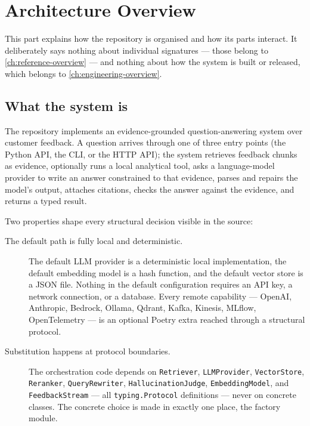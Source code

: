 
\chapter{Architecture Overview}
\label{ch:architecture-overview}

This part explains how the repository is organised and how its parts interact.
It deliberately says nothing about individual signatures --- those belong to
\cref{ch:reference-overview} --- and nothing about how the system is built or
released, which belongs to \cref{ch:engineering-overview}.

\section{What the system is}

The repository implements an evidence-grounded question-answering system over
customer feedback. A question arrives through one of three entry points (the
Python API, the CLI, or the HTTP API); the system retrieves feedback chunks as
evidence, optionally runs a local analytical tool, asks a language-model
provider to write an answer constrained to that evidence, parses and repairs
the model's output, attaches citations, checks the answer against the evidence,
and returns a typed result.

Two properties shape every structural decision visible in the source:

\begin{description}
  \item[The default path is fully local and deterministic.] The default LLM
    provider is a deterministic local implementation, the default embedding
    model is a hash function, and the default vector store is a JSON file.
    Nothing in the default configuration requires an API key, a network
    connection, or a database. Every remote capability --- OpenAI, Anthropic,
    Bedrock, Ollama, Qdrant, Kafka, Kinesis, MLflow, OpenTelemetry --- is an
    optional Poetry extra reached through a structural protocol.
  \item[Substitution happens at protocol boundaries.] The orchestration code
    depends on \texttt{Retriever}, \texttt{LLMProvider}, \texttt{VectorStore},
    \texttt{Reranker}, \texttt{QueryRewriter}, \texttt{HallucinationJudge},
    \texttt{EmbeddingModel}, and \texttt{FeedbackStream} --- all
    \texttt{typing.Protocol} definitions --- never on concrete classes. The
    concrete choice is made in exactly one place, the factory module.
\end{description}

